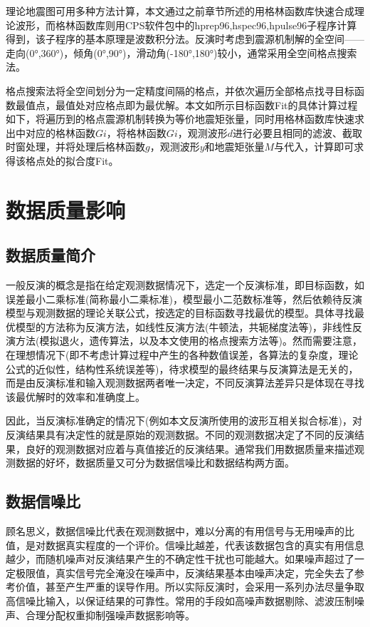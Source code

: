 理论地震图可用多种方法计算，本文通过之前章节所述的用格林函数库快速合成理论波形，而格林函数库则用CPS软件包中的hprep96,hspec96,hpulse96子程序计算得到，该子程序的基本原理是波数积分法。反演时考虑到震源机制解的全空间——走向(0°,360°)，倾角(0°,90°)，滑动角(-180°,180°)较小，通常采用全空间格点搜索法。

格点搜索法将全空间划分为一定精度间隔的格点，并依次遍历全部格点找寻目标函数最值点，最值处对应格点即为最优解。本文如所示目标函数Fit的具体计算过程如下，将遍历到的格点震源机制转换为等价地震矩张量\citep{Jost1989}，同时用格林函数库快速求出中对应的格林函数$Gi$，将格林函数$Gi$，观测波形$d$进行必要且相同的滤波、截取时窗处理，并将处理后格林函数$g$，观测波形$y$和地震矩张量$M$与代入，计算即可求得该格点处的拟合度Fit。


\section{数据质量影响}

\subsection{数据质量简介}

一般反演的概念是指在给定观测数据情况下，选定一个反演标准，即目标函数，如误差最小二乘标准(简称最小二乘标准)，模型最小二范数标准等，然后依赖待反演模型与观测数据的理论关联公式，按选定的目标函数寻找最优的模型。具体寻找最优模型的方法称为反演方法，如线性反演方法(牛顿法，共轭梯度法等)，非线性反演方法(模拟退火，遗传算法，以及本文使用的格点搜索方法等)。然而需要注意，在理想情况下(即不考虑计算过程中产生的各种数值误差，各算法的复杂度，理论公式的近似性，结构性系统误差等)，待求模型的最终结果与反演算法是无关的，而是由反演标准和输入观测数据两者唯一决定，不同反演算法差异只是体现在寻找该最优解时的效率和准确度上。

因此，当反演标准确定的情况下(例如本文反演所使用的波形互相关拟合标准)，对反演结果具有决定性的就是原始的观测数据。不同的观测数据决定了不同的反演结果，良好的观测数据对应着与真值接近的反演结果。通常我们用数据质量来描述观测数据的好坏，数据质量又可分为数据信噪比和数据结构两方面。

\subsection{数据信噪比}

顾名思义，数据信噪比代表在观测数据中，难以分离的有用信号与无用噪声的比值，是对数据真实程度的一个评价。信噪比越差，代表该数据包含的真实有用信息越少，而随机噪声对反演结果产生的不确定性干扰也可能越大。如果噪声超过了一定极限值，真实信号完全淹没在噪声中，反演结果基本由噪声决定，完全失去了参考价值，甚至产生严重的误导作用。所以实际反演时，会采用一系列办法尽量争取高信噪比输入，以保证结果的可靠性。常用的手段如高噪声数据剔除、滤波压制噪声、合理分配权重抑制强噪声数据影响等。

